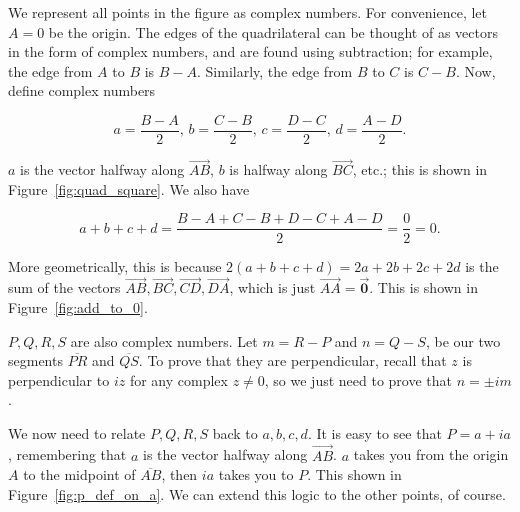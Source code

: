 \documentclass[../textbook.tex]{subfiles}
\begin{document}
We represent all points in the figure as complex numbers. For convenience, let $A=0$ be the origin. The edges of the quadrilateral can be thought of as vectors in the form of complex numbers, and are found using subtraction; for example, the edge from $A$ to $B$ is $B-A$. Similarly, the edge from $B$ to $C$ is $C-B$. Now, define complex numbers

$$a=\frac{B-A}{2},\, b=\frac{C-B}{2},\, c = \frac{D-C}{2},\, d = \frac{A-D}{2}.$$

\noindent$a$ is the vector halfway along $\overrightarrow{AB}$, $b$ is halfway along $\overrightarrow{BC}$, etc.; this is shown in Figure~\ref{fig:quad_square}. We also have

$$a+b+c+d=\frac{B-A+C-B+D-C+A-D}{2}=\frac{0}{2}=0.$$

\noindent More geometrically, this is because $2(a+b+c+d)=2a+2b+2c+2d$ is the sum of the vectors $\overrightarrow{AB}, \overrightarrow{BC}, \overrightarrow{CD}, \overrightarrow{DA}$, which is just $\overrightarrow{AA}=\overrightarrow{\mathbf{0}}$. This is shown in Figure~\ref{fig:add_to_0}.

$P,Q,R,S$ are also complex numbers. Let $m=R-P$ and $n = Q-S$, be our two segments $\overline{PR}$ and $\overline{QS}$. To prove that they are perpendicular, recall that $z$ is perpendicular to $iz$ for any complex $z\neq 0$, so we just need to prove that $n=\pm im$.

We now need to relate $P,Q,R,S$ back to $a,b,c,d$. It is easy to see that $P = a+ia$, remembering that $a$ is the vector halfway along $\overrightarrow{AB}$. $a$ takes you from the origin $A$ to the midpoint of $\overline{AB}$, then $ia$ takes you to $P$. This shown in Figure~\ref{fig:p_def_on_a}. We can extend this logic to the other points, of course.

\end{document}
